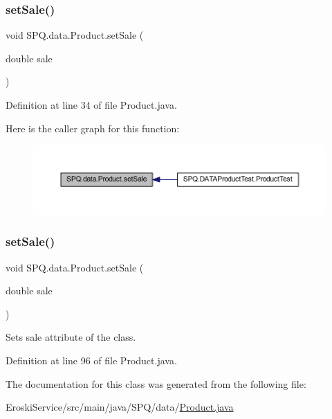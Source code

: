 \subsubsection{\texorpdfstring{set\+Sale()}{setSale()}\hspace{0.1cm}{\footnotesize\ttfamily [1/2]}}
{\footnotesize\ttfamily void S\+P\+Q.\+data.\+Product.\+set\+Sale (\begin{DoxyParamCaption}\item[{double}]{sale }\end{DoxyParamCaption})}



Definition at line 34 of file Product.\+java.

Here is the caller graph for this function\+:\nopagebreak
\begin{figure}[H]
\begin{center}
\leavevmode
\includegraphics[width=350pt]{class_s_p_q_1_1data_1_1_product_ab7714f5e5a6f1b0a293ad7140c351c3c_icgraph}
\end{center}
\end{figure}
\mbox{\label{class_s_p_q_1_1data_1_1_product_ab7714f5e5a6f1b0a293ad7140c351c3c}} 
\subsubsection{\texorpdfstring{set\+Sale()}{setSale()}\hspace{0.1cm}{\footnotesize\ttfamily [2/2]}}
{\footnotesize\ttfamily void S\+P\+Q.\+data.\+Product.\+set\+Sale (\begin{DoxyParamCaption}\item[{double}]{sale }\end{DoxyParamCaption})}

Sets sale attribute of the class. 

Definition at line 96 of file Product.\+java.



The documentation for this class was generated from the following file\+:\begin{DoxyCompactItemize}
\item 
Eroski\+Service/src/main/java/\+S\+P\+Q/data/\mbox{\hyperlink{_eroski_service_2src_2main_2java_2_s_p_q_2data_2_product_8java}{Product.\+java}}\end{DoxyCompactItemize}

